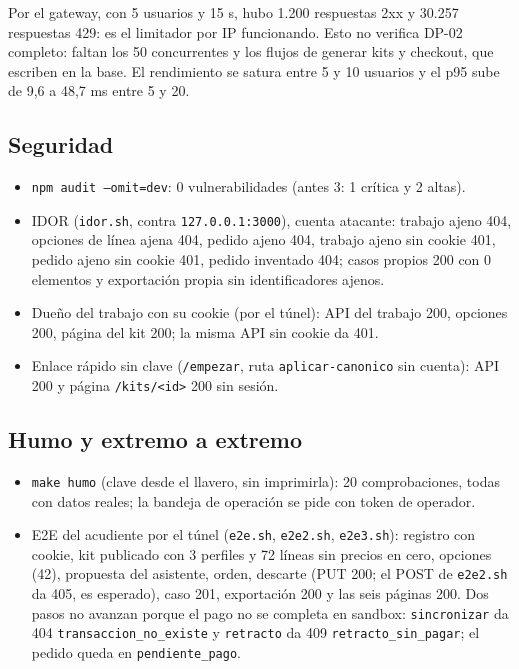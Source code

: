 \documentclass[11pt,letterpaper]{article}
\newcommand{\ruta}[1]{\texttt{\small #1}}
\begin{document}
Por el gateway, con 5 usuarios y 15 s, hubo 1.200 respuestas 2xx y 30.257 respuestas 429: es el limitador por IP
funcionando. Esto no verifica DP-02 completo: faltan los 50 concurrentes y los flujos de generar kits y checkout,
que escriben en la base. El rendimiento se satura entre 5 y 10 usuarios y el p95 sube de 9,6 a 48,7 ms entre 5 y 20.

\subsection{Seguridad}

\begin{itemize}
  \item \ruta{npm audit --omit=dev}: 0 vulnerabilidades (antes 3: 1 crítica y 2 altas).
  \item IDOR (\ruta{idor.sh}, contra \ruta{127.0.0.1:3000}), cuenta atacante: trabajo ajeno 404, opciones de línea ajena 404, pedido ajeno 404, trabajo ajeno sin cookie 401, pedido ajeno sin cookie 401, pedido inventado 404; casos propios 200 con 0 elementos y exportación propia sin identificadores ajenos.
  \item Dueño del trabajo con su cookie (por el túnel): API del trabajo 200, opciones 200, página del kit 200; la misma API sin cookie da 401.
  \item Enlace rápido sin clave (\ruta{/empezar}, ruta \ruta{aplicar-canonico} sin cuenta): API 200 y página \ruta{/kits/<id>} 200 sin sesión.
\end{itemize}

\subsection{Humo y extremo a extremo}

\begin{itemize}
  \item \ruta{make humo} (clave desde el llavero, sin imprimirla): 20 comprobaciones, todas con datos reales; la bandeja de operación se pide con token de operador.
  \item E2E del acudiente por el túnel (\ruta{e2e.sh}, \ruta{e2e2.sh}, \ruta{e2e3.sh}): registro con cookie, kit publicado con 3 perfiles y 72 líneas sin precios en cero, opciones (42), propuesta del asistente, orden, descarte (PUT 200; el POST de \ruta{e2e2.sh} da 405, es esperado), caso 201, exportación 200 y las seis páginas 200. Dos pasos no avanzan porque el pago no se completa en sandbox: \ruta{sincronizar} da 404 \ruta{transaccion\_\allowbreak{}no\_\allowbreak{}existe} y \ruta{retracto} da 409 \ruta{retracto\_\allowbreak{}sin\_\allowbreak{}pagar}; el pedido queda en \ruta{pendiente\_\allowbreak{}pago}.
\end{itemize}
\end{document}
